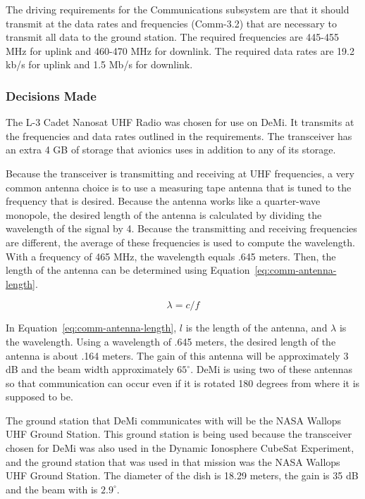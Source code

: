 \documentclass[12pt]{article}
\begin{document}
The driving requirements for the Communications subsystem are that it should transmit at the data rates and frequencies (Comm-3.2) that are necessary to transmit all data to the ground station. The required frequencies are 445-455 MHz for uplink and 460-470 MHz for downlink. The required data rates are 19.2 kb/s for uplink and 1.5 Mb/s for downlink.

			\subsubsection{Decisions Made}\label{sec:comm_decisions}

The L-3 Cadet Nanosat UHF Radio was chosen for use on DeMi. It transmits at the frequencies and data rates outlined in the requirements. The transceiver has an extra 4 GB of storage that avionics uses in addition to any of its storage. 

Because the transceiver is transmitting and receiving at UHF frequencies, a very common antenna choice is to use a measuring tape antenna that is tuned to the frequency that is desired. Because the antenna works like a quarter-wave monopole, the desired length of the antenna is calculated by dividing the wavelength of the signal by 4. Because the transmitting and receiving frequencies are different, the average of these frequencies is used to compute the wavelength. With a frequency of 465 MHz, the wavelength equals .645 meters. Then, the length of the antenna can be determined using Equation~\ref{eq:comm-antenna-length}.

\begin{equation}\label{eq:comm-antenna-length}
\lambda = c/f
\end{equation}

In Equation~\ref{eq:comm-antenna-length}, $l$ is the length of the antenna, and $\lambda$ is the wavelength.
Using a wavelength of .645 meters, the desired length of the antenna is about .164 meters. The
gain of this antenna will be approximately 3 dB and the beam width approximately $65^\circ$. DeMi is
using two of these antennas so that communication can occur even if it is rotated 180 degrees
from where it is supposed to be.

The ground station that DeMi communicates with will be the NASA Wallops UHF Ground Station. This ground station is being used because the transceiver chosen for DeMi was also used in the Dynamic Ionosphere CubeSat Experiment, and the ground station that was used in that mission was the NASA Wallops UHF Ground Station. The diameter of the dish is 18.29 meters, the gain is 35 dB and the beam with is $2.9^\circ$.
\end{document}
